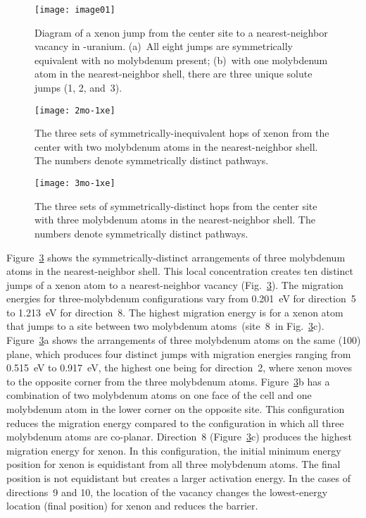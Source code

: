 \begin{figure}
  \centering
  \texttt{[image: image01]}
	\caption[Diagram of a xenon jump from the center site to a
    nearest-neighbor vacancy in \textgamma-uranium.
    ]{Diagram of a xenon jump from the center site to a
    nearest-neighbor vacancy in \textgamma-uranium.
    (a)~All eight jumps are symmetrically equivalent with no molybdenum
    present;
    (b)~with one molybdenum atom in the nearest-neighbor shell, there are
        three unique solute jumps (1, 2, and~3).}
      \label{figure01}
\end{figure}

\begin{figure}
    \centering
    \texttt{[image: 2mo-1xe]}
    \caption[The three sets of symmetrically-inequivalent hops of xenon from the center
        with two molybdenum atoms in the nearest-neighbor shell.]{The three sets of symmetrically-inequivalent hops of xenon from the center
        with two molybdenum atoms in the nearest-neighbor shell.
        The numbers denote symmetrically distinct pathways.}
    \label{figure02}
\end{figure}

\begin{figure}
    \centering
    \texttt{[image: 3mo-1xe]}
    \caption[The three sets of symmetrically-distinct hops from the center site
        with three molybdenum atoms in the nearest-neighbor shell]{The three sets of symmetrically-distinct hops from the center site with three molybdenum atoms in the nearest-neighbor shell. The numbers denote symmetrically distinct pathways.}
    \label{figure03}
\end{figure}

Figure~\ref{figure03} shows the symmetrically-distinct arrangements of three
molybdenum atoms in the nearest-neighbor shell.
This local concentration creates ten distinct jumps of a xenon atom to a
nearest-neighbor vacancy (Fig.~\ref{figure03}).
The migration energies for three-molybdenum configurations vary from 0.201~eV
for direction~5 to 1.213~eV for direction~8.
The highest migration energy is for a xenon atom that jumps to a site between
two molybdenum atoms~(site~8\ in Fig.~\ref{figure03}c).
Figure~\ref{figure03}a shows the arrangements of three molybdenum atoms on the
same \hkl(100) plane, which produces four distinct jumps with migration
energies ranging from 0.515~eV to 0.917~eV, the highest one being for
direction~2, where xenon moves to the opposite corner from the three molybdenum
atoms.
Figure~\ref{figure03}b has a combination of two molybdenum atoms on one face
of the cell and one molybdenum atom in the lower corner on the opposite site. 
This configuration reduces the migration energy compared to the configuration
in which all three molybdenum atoms are co-planar. Direction~8 (Figure~\ref{figure03}c) produces the highest migration energy for xenon. 
In this configuration, the initial minimum energy position for xenon is
equidistant from all three molybdenum atoms. The final position is not
equidistant but creates a larger activation energy. In the cases of
directions~9 and 10, the location of the vacancy changes the lowest-energy
location (final position) for xenon and reduces the barrier.
 

